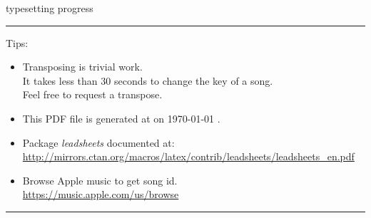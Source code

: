 \documentclass{article}
\begin{document}



\par
{\ttfamily typesetting progress} \par
\bigskip

\label{lbtoc}
\newcommand{\cursec}[0]{}
\tableofcontents
\bigskip
\hrule
\bigskip
Tips:
\begin{itemize}
  \item Transposing is trivial work. \\ It takes less than 30 seconds to change the key of a song. \\ Feel free to request a transpose.
  \item This PDF file is generated at \textbraceleft{} \currenttime{} \textbraceright{} on \textbraceleft{} \today{} \textbraceright{}.
  \item Package \textit{leadsheets} documented at: \\ \url{http://mirrors.ctan.org/macros/latex/contrib/leadsheets/leadsheets_en.pdf}
  \item Browse Apple music to get song id. \\ \url{https://music.apple.com/us/browse}
\end{itemize}
\hrule
\pagebreak

\end{document}

